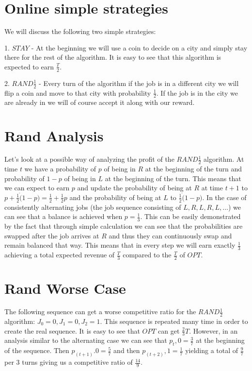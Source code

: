 \documentclass[]{article}
\newcommand{\rand}{ $ RAND \frac{1}{2} $ }
\begin{document}
\section{Online simple strategies}

We will discuss the following two simple strategies:

1. $ STAY $ - At the beginning we will use a coin to decide on a city and simply stay there for the rest of the algorithm. It is easy to see that this algorithm is expected to earn $ \frac{T}{2} $.

2. \rand - Every turn of the algorithm if the job is in a different city we will flip a coin and move to that city with probability $ \frac{1}{2} $. If the job is in the city we are already in we will of course accept it along with our reward.

\section{Rand Analysis}

Let's look at a possible way of analyzing the profit of the \rand algorithm. At time $ t $ we have a probability of $ p $ of being in $ R $ at the beginning of the turn and probability of $ 1 - p $ of being in $ L $ at the beginning of the turn. This means that we can expect to earn $ p $ and update the probability of being at $ R $ at time $ t + 1 $ to $ p + \frac{1}{2} \dot ( 1 - p ) = \frac{1}{2} + \frac{1}{2}p$ and the probability of being at $ L $ to $ \frac{1}{2} \dot ( 1 - p ) $. In the case of consistently alternating jobs (the job sequence consisting of $ L, R, L, R, L, \ldots $) we can see that a balance is achieved when $ p = \frac{1}{3} $. This can be easily demonstrated by the fact that through simple calculation we can see that the probabilities are swapped after the job arrives at $ R $ and thus they can continuously swap and remain balanced that way. This means that in every step we will earn exactly $ \frac{1}{3} $ achieving a total expected revenue of $ \frac{T}{3} $ compared to the $ \frac{T}{2} $ of $ OPT $.


\section{Rand Worse Case}

The following sequence can get a worse competitive ratio for the \rand algorithm: $ J_0 = 0, J_1=0, J_2 = 1 $. This sequence is repeated many time in order to create the real sequence. It is easy to see that $ OPT $ can get $ \frac{2}{3}T $. However, in an analysis similar to the alternating case we can see that $ p_t,0 = \frac{3}{7} $ at the beginning of the sequence. Then $ p_(t+1).0 = \frac{5}{7} $ and then $ p_(t+2),1 = \frac{1}{7} $ yielding a total of $ \frac{9}{7} $ per $ 3 $ turns giving us a competitive ratio of $ \frac{14}{9} $.
\end{document}
